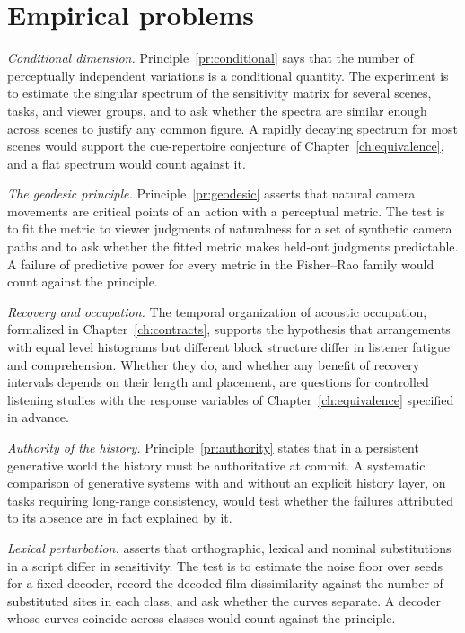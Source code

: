 \section{Empirical problems}

\emph{Conditional dimension.} Principle~\ref{pr:conditional} says that the number of perceptually independent variations is a conditional quantity. The experiment is to estimate the singular spectrum of the sensitivity matrix for several scenes, tasks, and viewer groups, and to ask whether the spectra are similar enough across scenes to justify any common figure. A rapidly decaying spectrum for most scenes would support the cue-repertoire conjecture of Chapter~\ref{ch:equivalence}, and a flat spectrum would count against it.

\emph{The geodesic principle.} Principle~\ref{pr:geodesic} asserts that natural camera movements are critical points of an action with a perceptual metric. The test is to fit the metric to viewer judgments of naturalness for a set of synthetic camera paths and to ask whether the fitted metric makes held-out judgments predictable. A failure of predictive power for every metric in the Fisher--Rao family would count against the principle.

\emph{Recovery and occupation.} The temporal organization of acoustic occupation, formalized in Chapter~\ref{ch:contracts}, supports the hypothesis that arrangements with equal level histograms but different block structure differ in listener fatigue and comprehension. Whether they do, and whether any benefit of recovery intervals depends on their length and placement, are questions for controlled listening studies with the response variables of Chapter~\ref{ch:equivalence} specified in advance.

\emph{Authority of the history.} Principle~\ref{pr:authority} states that in a persistent generative world the history must be authoritative at commit. A systematic comparison of generative systems with and without an explicit history layer, on tasks requiring long-range consistency, would test whether the failures attributed to its absence are in fact explained by it.

\emph{Lexical perturbation.}  asserts that orthographic, lexical and nominal substitutions in a script differ in sensitivity. The test is to estimate the noise floor over seeds for a fixed decoder, record the decoded-film dissimilarity against the number of substituted sites in each class, and ask whether the curves separate. A decoder whose curves coincide across classes would count against the principle.

